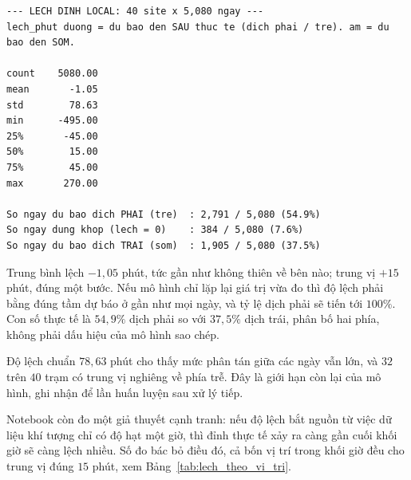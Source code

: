 \documentclass[12pt, a4paper]{report}
\begin{document}
\begingroup
\par{}\vspace{8pt}
\scriptsize\renewcommand{\baselinestretch}{1.0}\selectfont
\begin{verbatim}
--- LECH DINH LOCAL: 40 site x 5,080 ngay ---
lech_phut duong = du bao den SAU thuc te (dich phai / tre). am = du bao den SOM.

count    5080.00
mean       -1.05
std        78.63
min      -495.00
25%       -45.00
50%        15.00
75%        45.00
max       270.00

So ngay du bao dich PHAI (tre)  : 2,791 / 5,080 (54.9%)
So ngay dung khop (lech = 0)    : 384 / 5,080 (7.6%)
So ngay du bao dich TRAI (som)  : 1,905 / 5,080 (37.5%)
\end{verbatim}
\par\vspace{8pt}
\endgroup
Trung bình lệch $-1{,}05$ phút, tức gần như không thiên về bên nào; trung vị $+15$ phút, đúng
một bước. Nếu mô hình chỉ lặp lại giá trị vừa đo thì độ lệch phải bằng đúng tầm dự báo ở gần
như mọi ngày, và tỷ lệ dịch phải sẽ tiến tới $100\%$. Con số thực tế là $54{,}9\%$ dịch phải so
với $37{,}5\%$ dịch trái, phân bố hai phía, không phải dấu hiệu của mô hình sao chép.

Độ lệch chuẩn $78{,}63$ phút cho thấy mức phân tán giữa các ngày vẫn lớn, và $32$ trên $40$
trạm có trung vị nghiêng về phía trễ. Đây là giới hạn còn lại của mô hình, ghi nhận để lần huấn
luyện sau xử lý tiếp.

Notebook còn đo một giả thuyết cạnh tranh: nếu độ lệch bắt nguồn từ việc dữ liệu khí tượng chỉ
có độ hạt một giờ, thì đỉnh thực tế xảy ra càng gần cuối khối giờ sẽ càng lệch nhiều.
Số đo bác bỏ điều đó, cả bốn vị trí trong khối giờ đều cho trung vị đúng $15$ phút, xem Bảng~\ref{tab:lech_theo_vi_tri}.
\end{document}
